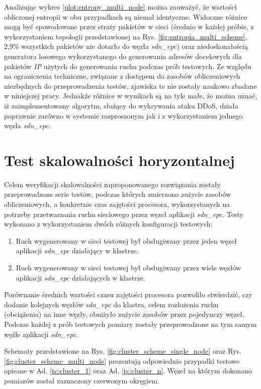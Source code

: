 Analizując wykres \ref{plot:entropy_multi_node} można zauważyć, że wartości
obliczonej entropii w obu przypadkach są niemal identyczne. Widoczne różnice
mogą być spowodowane przez straty pakietów w sieci (średnio w każdej próbie, z
wykorzystaniem topologii przedstawionej na Rys. \ref{fig:entropia_multi_scheme},
2,9\% wszystkich pakietów nie dotarło do węzła \textit{sdn\_epc}) oraz
niedoskonałością generatora losowego wykorzystanego do generowania adresów
docelowych dla pakietów \textit{IP} użytych do generowania ruchu podczas prób
testowych. Ze względu na ograniczenia techniczne, związane z dostępem do zasobów
obliczeniowych niezbędnych do przeprowadzenia testów, zjawiska te nie zostały
naukowo zbadane w niniejszej pracy. Jednakże różnice w wynikach są  na tyle
małe, że można uznać, iż zaimplementowany algorytm, służący do wykrywania ataku
DDoS, działa poprawnie zarówno w systemie rozproszonym jak i z wykorzystaniem
jednego węzła \textit{sdn\_epc}.

\section{Test skalowalności horyzontalnej}

Celem weryfikacji skalowalności zaproponowanego rozwiązania zostały
przeprowadzone serie testów, podczas których zmierzono zużycie zasobów
obliczeniowych, a konkretnie czas zajętości procesora, wykorzystanych na
potrzeby przetwarzania ruchu sieciowego przez węzeł aplikacji \textit{sdn\_epc}.
Testy wykonano z wykorzystaniem dwóch różnych konfiguracji testowych:
\begin{enumerate}
  \item \label{tc:cluster_1} Ruch wygenerowany w sieci testowej był obsługiwany
    przez jeden węzeł aplikacji \textit{sdn\_epc} działający w klastrze.
  \item \label{tc:cluster_n} Ruch wygenerowany w sieci testowej był obsługiwany
    przez wiele węzłów aplikacji \textit{sdn\_epc} działających w klastrze.
\end{enumerate}

Porównanie średnich wartości czasu zajętości procesora pozwoliło stwierdzić,
czy dodanie kolejnych węzłów \textit{sdn\_epc} do klastra, celem rozłożenia
ruchu (obciążenia) na inne węzły, obniżyło zużycie zasobów przez pojedynczy
węzeł. Podczas każdej z prób testowych pomiary zostały przeprowadzone na tym
samym węźle aplikacji \textit{sdn\_epc}.

Schematy przedstawione na Rys. \ref{fig:cluster_scheme_single_node} oraz
Rys. \ref{fig:cluster_scheme_multi_node} prezentują odpowiednio przypadki
testowe opisane w Ad. \ref{tc:cluster_1} oraz Ad. \ref{tc:cluster_n}. Węzeł
na którym dokonano pomiarów został zaznaczony czerwonym okręgiem.
\newpage


